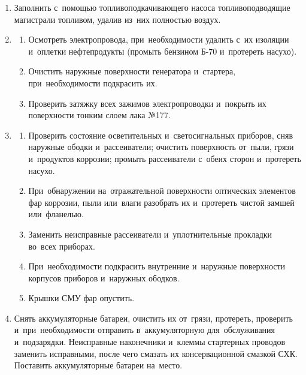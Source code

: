 \begin{enumerate}
    \item Заполнить с~помощью топливоподкачивающего насоса топливоподводящие магистрали топливом, удалив из~них полностью воздух. 

    \item \begin{enumerate}
        \item Осмотреть электропровода, при~необходимости удалить с~их изоляции и~оплетки нефтепродукты (промыть бензином Б-70 и~протереть насухо). 
        
        \item Очистить наружные поверхности генератора и~стартера, при~необходимости подкрасить их. 
            
        \item Проверить затяжку всех зажимов электропроводки и~покрыть их поверхности тонким слоем лака №177. 
    \end{enumerate}
    

    \item \begin{enumerate}
        \item Проверить состояние осветительных и~светосигнальных приборов, сняв наружные ободки и~рассеиватели; очистить поверхность от~пыли, грязи и~продуктов коррозии; промыть рассеиватели с~обеих сторон и~протереть насухо. 
        
        \item При~обнаружении на~отражательной поверхности оптических элементов фар коррозии, пыли или~влаги разобрать их и~протереть чистой замшей или~фланелью. 
            
        \item Заменить неисправные рассеиватели и~уплотнительные прокладки во~всех приборах. 
            
        \item При~необходимости подкрасить внутренние и~наружные поверхности корпусов приборов и~наружных ободков. 
            
        \item Крышки СМУ фар опустить. 
    \end{enumerate}

    \item Снять аккумуляторные батареи, очистить их от~грязи, протереть, проверить и~при~необходимости отправить в~аккумуляторную для~обслуживания и~подзарядки. 
    Неисправные наконечники и~клеммы стартерных проводов заменить исправными, после чего смазать их консервационной смазкой СХК. 
    Поставить аккумуляторные батареи на~место. 


\end{enumerate}
